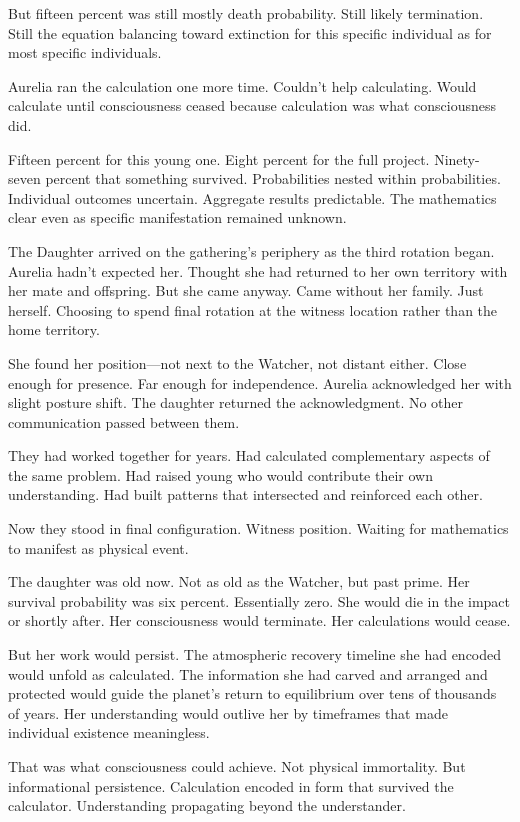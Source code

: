 But fifteen percent was still mostly death probability. Still likely termination. Still the equation balancing toward extinction for this specific individual as for most specific individuals.

Aurelia ran the calculation one more time. Couldn't help calculating. Would calculate until consciousness ceased because calculation was what consciousness did.

Fifteen percent for this young one. Eight percent for the full project. Ninety-seven percent that something survived. Probabilities nested within probabilities. Individual outcomes uncertain. Aggregate results predictable. The mathematics clear even as specific manifestation remained unknown.

\scenebreak

The Daughter arrived on the gathering's periphery as the third rotation began. Aurelia hadn't expected her. Thought she had returned to her own territory with her mate and offspring. But she came anyway. Came without her family. Just herself. Choosing to spend final rotation at the witness location rather than the home territory.

She found her position—not next to the Watcher, not distant either. Close enough for presence. Far enough for independence. Aurelia acknowledged her with slight posture shift. The daughter returned the acknowledgment. No other communication passed between them.

They had worked together for years. Had calculated complementary aspects of the same problem. Had raised young who would contribute their own understanding. Had built patterns that intersected and reinforced each other.

Now they stood in final configuration. Witness position. Waiting for mathematics to manifest as physical event.

The daughter was old now. Not as old as the Watcher, but past prime. Her survival probability was six percent. Essentially zero. She would die in the impact or shortly after. Her consciousness would terminate. Her calculations would cease.

But her work would persist. The atmospheric recovery timeline she had encoded would unfold as calculated. The information she had carved and arranged and protected would guide the planet's return to equilibrium over tens of thousands of years. Her understanding would outlive her by timeframes that made individual existence meaningless.

That was what consciousness could achieve. Not physical immortality. But informational persistence. Calculation encoded in form that survived the calculator. Understanding propagating beyond the understander.

